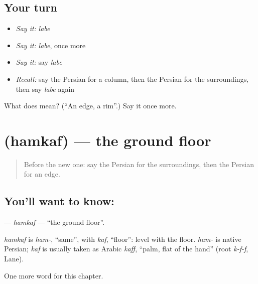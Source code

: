 \subsection*{Your turn}
\begin{itemize}
\raggedright
  \item \emph{Say it:} \emph{labe}
  \item \emph{Say it:} \emph{labe}, once more
  \item \emph{Say it:} say \emph{labe}
  \item \emph{Recall:} say the Persian for a column, then the Persian for the surroundings, then say \emph{labe} again
\end{itemize}

\begin{tcolorbox}[breakable,colback=teal!4,colframe=teal!35!black,title={Before you move on}]
What does  mean? (\textquotedblleft{}An edge, a rim\textquotedblright{}.) Say it once more.
\end{tcolorbox}
\section[\texorpdfstring{\fa{همکف} (hamkaf)}{همکف (hamkaf)}]{ (hamkaf) — the ground floor}

\label{lesson:FA-C196-hamkaf}



\begin{quote}
Before the new one: say the Persian for the surroundings, then the Persian for an edge.
\end{quote}

\subsection*{You'll want to know: }
\textbf{} — \emph{hamkaf} — \textquotedblleft{}the ground floor\textquotedblright{}.

\begin{cousinweb}
\emph{hamkaf} is \emph{ham-}, \textquotedblleft{}same\textquotedblright{}, with \emph{kaf}, \textquotedblleft{}floor\textquotedblright{}: level with the floor. \emph{ham-} is native Persian; \emph{kaf} is usually taken as Arabic \emph{kaff}, \textquotedblleft{}palm, flat of the hand\textquotedblright{} (root \emph{k-f-f}, Lane).
\end{cousinweb}

\begin{grammarlens}[title={What you've built}]
One more word for this chapter.
\end{grammarlens}

